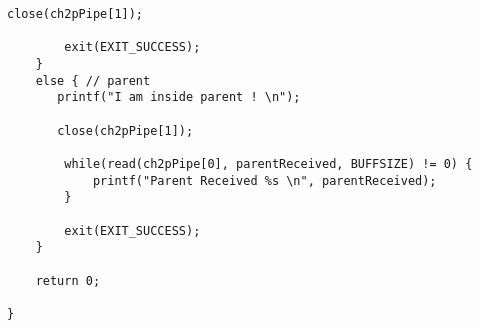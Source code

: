 \documentclass[a4paper,15pt]{article}
\begin{document}
\begin{lstlisting}[style=CStyle, label=some-code, caption=Przekazywanie danych przez kilka łączy.]
        close(ch2pPipe[1]);
      
        exit(EXIT_SUCCESS);
    }
    else { // parent
       printf("I am inside parent ! \n");

       close(ch2pPipe[1]);
     
        while(read(ch2pPipe[0], parentReceived, BUFFSIZE) != 0) {
            printf("Parent Received %s \n", parentReceived);
        }

        exit(EXIT_SUCCESS);
    }

    return 0;

}

\end{lstlisting}
\end{document}
